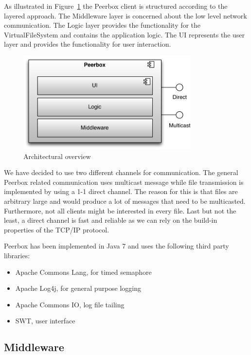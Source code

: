 
As illustrated in Figure~\ref{fig:figures_archOverview} the Peerbox client is structured according to the layered approach. The Middleware layer is concerned about the low level network communication. The Logic layer provides the functionality for the VirtualFileSystem and contains the application logic. The UI represents the user layer and provides the functionality for user interaction.

\begin{figure}[htbp]
    \centering
        \includegraphics[height=2in]{figures/archOverview.pdf}
    \caption{Architectural overview}
    \label{fig:figures_archOverview}
\end{figure}

We have decided to use two different channels for communication. The general Peerbox related communication uses multicast message while file transmission is implemented by using a 1-1 direct channel. 
The reason for this is that files are arbitrary large and would produce a lot of messages that need to be multicasted. Furthermore, not all clients might be interested in every file. Last but not the least, a direct channel is fast and reliable as we can rely on the build-in properties of the TCP/IP protocol.

Peerbox has been implemented in Java 7 and uses the following third party libraries: 
\begin{itemize}
    \item Apache Commons Lang, for timed semaphore
    \item Apache Log4j, for general purpose logging
    \item Apache Commons IO, log file tailing
    \item SWT, user interface
\end{itemize}

\subsection{Middleware}


